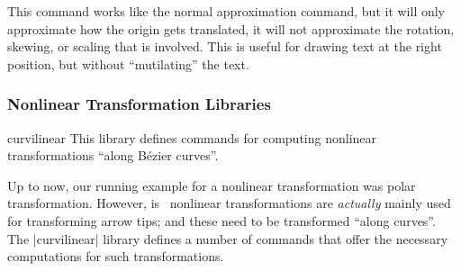 \begin{command}{\pgfapproximatenonlineartranslation}
    This command works like the normal approximation command, but it will only
    approximate how the origin gets translated, it will not approximate the
    rotation, skewing, or scaling that is involved. This is useful for drawing
    text at the right position, but without ``mutilating'' the text.
\begin{codeexample}[preamble={\usepgfmodule{nonlineartransformations}}]
\end{codeexample}
\end{command}


\subsubsection{Nonlinear Transformation Libraries}
\label{section-library-curvilinear}

\begin{pgflibrary}{curvilinear}
    This library defines commands for computing nonlinear transformations
    ``along Bézier curves''.
\end{pgflibrary}

Up to now, our running example for a nonlinear transformation was polar
transformation. However, is \pgfname\ nonlinear transformations are
\emph{actually} mainly used for transforming arrow tips; and these need to be
transformed ``along curves''. The |curvilinear| library defines a number of
commands that offer the necessary computations for such transformations.

